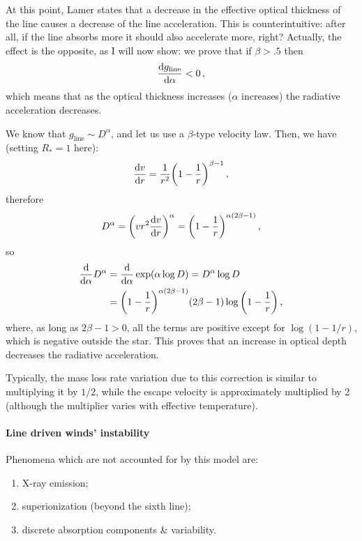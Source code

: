 \documentclass[main.tex]{subfiles}
\begin{document}
\begin{bluebox}
At this point, Lamer states that a decrease in the effective optical thickness of the line causes a decrease of the line acceleration. 
This is counterintuitive: after all, if the line absorbs more it should also accelerate more, right?
Actually, the effect is the opposite, as I will now show: we prove that if \(\beta > \num{.5}\) then
%
\begin{align}
\dv{g _{\text{line}}}{\alpha } < 0
\,,
\end{align}
%
which means that as the optical thickness increases (\(\alpha \) increases) the radiative acceleration decreases.

We know that \(g _{\text{line}} \sim D^{\alpha }\), and let us use a \(\beta \)-type velocity law. Then, we have (setting \(R_{*} =1\) here):
%
\begin{align}
\dv{v}{r} = \frac{1}{r^2} \qty(1 - \frac{1}{r})^{\beta -1}
\,,
\end{align}
%
therefore 
%
\begin{align}
D^{\alpha } = \qty(v r^2 \dv{v}{r})^{\alpha}
= \qty(1 - \frac{1}{r})^{\alpha (2\beta -1)}
\,,
\end{align}
%
so 
%
\begin{subequations}
\begin{align}
\dv{}{\alpha } D^{\alpha }
&= \dv{}{\alpha } \exp(\alpha \log D)
= D^{\alpha } \log D  \\
&= \qty(1 - \frac{1}{r})^{\alpha (2 \beta -1)}
(2 \beta -1 ) \log \qty(1 - \frac{1}{r})
\,,
\end{align}
\end{subequations}
%
where, as long as \(2 \beta -1 >0\), all the terms are positive except for \(\log (1 - 1/r)\), which is negative outside the star.
This proves that an increase in optical depth decreases the radiative acceleration.
\end{bluebox}

Typically, the mass loss rate variation due to this correction is similar to multiplying it by \(1/2\), while the escape velocity is approximately multiplied by 2 (although the multiplier varies with effective temperature).

\paragraph{Line driven winds' instability}

Phenomena which are not accounted for by this model are: 
\begin{enumerate}
    \item X-ray emission;
    \item superionization (beyond the sixth line);
    \item discrete absorption components \& variability.
\end{enumerate}
\end{document}
